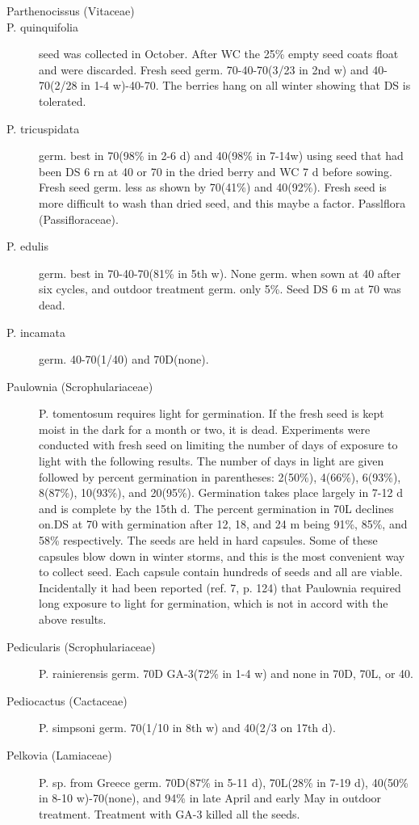 \begin{description}
\item[Parthenocissus (Vitaceae)]
\item[P. quinquifolia] seed was collected in October. After WC the 25\% empty seed
coats float and were discarded. Fresh seed germ. 70-40-70(3/23 in 2nd w) and 40-
70(2/28 in 1-4 w)-40-70. The berries hang on all winter showing that DS is tolerated.
\item[P. tricuspidata] germ. best in 70(98\% in 2-6 d) and 40(98\% in 7-14w) using
seed that had been DS 6 rn at 40 or 70 in the dried berry and WC 7 d before sowing.
Fresh seed germ. less as shown by 70(41\%) and 40(92\%). Fresh seed is more
difficult to wash than dried seed, and this maybe a factor.
Passlflora (Passifloraceae).
\item[P. edulis] germ. best in 70-40-70(81\% in 5th w). None germ. when sown at 40
after six cycles, and outdoor treatment germ. only 5\%. Seed DS 6 m at 70 was dead.
\item[P. incamata] germ. 40-70(1/40) and 70D(none).

\item[Paulownia (Scrophulariaceae)] P. tomentosum requires light for
germination. If the fresh seed is kept moist in the dark for a month or two, it is dead.
Experiments were conducted with fresh seed on limiting the number of days of
exposure to light with the following results. The number of days in light are given
followed by percent germination in parentheses: 2(50\%), 4(66\%), 6(93\%), 8(87\%),
10(93\%), and 20(95\%). Germination takes place largely in 7-12 d and is complete by
the 15th d. The percent germination in 70L declines on.DS at 70 with germination
after 12, 18, and 24 m being 91\%, 85\%, and 58\% respectively. The seeds are held in
hard capsules. Some of these capsules blow down in winter storms, and this is the
most convenient way to collect seed. Each capsule contain hundreds of seeds and all
are viable. Incidentally it had been reported (ref. 7, p. 124) that Paulownia required
long exposure to light for germination, which is not in accord with the above results.

\item[Pedicularis (Scrophulariaceae)] P. rainierensis germ. 70D GA-3(72\% in
1-4 w) and none in 70D, 70L, or 40.
\item[Pediocactus (Cactaceae)] P. simpsoni germ. 70(1/10 in 8th w) and 40(2/3
on 17th d).

\item[Pelkovia (Lamiaceae)] P. sp. from Greece germ. 70D(87\% in 5-11 d),
70L(28\% in 7-19 d), 40(50\% in 8-10 w)-70(none), and 94\% in late April and early May
in outdoor treatment. Treatment with GA-3 killed all the seeds.


\end{description}
